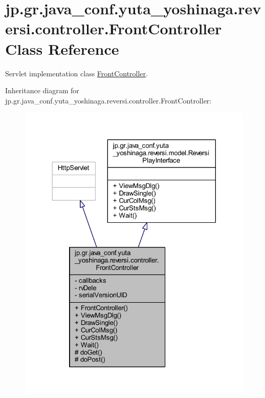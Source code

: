 \hypertarget{classjp_1_1gr_1_1java__conf_1_1yuta__yoshinaga_1_1reversi_1_1controller_1_1_front_controller}{}\section{jp.\+gr.\+java\+\_\+conf.\+yuta\+\_\+yoshinaga.\+reversi.\+controller.\+Front\+Controller Class Reference}
\label{classjp_1_1gr_1_1java__conf_1_1yuta__yoshinaga_1_1reversi_1_1controller_1_1_front_controller}


Servlet implementation class \mbox{\hyperlink{classjp_1_1gr_1_1java__conf_1_1yuta__yoshinaga_1_1reversi_1_1controller_1_1_front_controller}{Front\+Controller}}.  




Inheritance diagram for jp.\+gr.\+java\+\_\+conf.\+yuta\+\_\+yoshinaga.\+reversi.\+controller.\+Front\+Controller\+:
\nopagebreak
\begin{figure}[H]
\begin{center}
\leavevmode
\includegraphics[width=324pt]{classjp_1_1gr_1_1java__conf_1_1yuta__yoshinaga_1_1reversi_1_1controller_1_1_front_controller__inherit__graph}
\end{center}
\end{figure}


